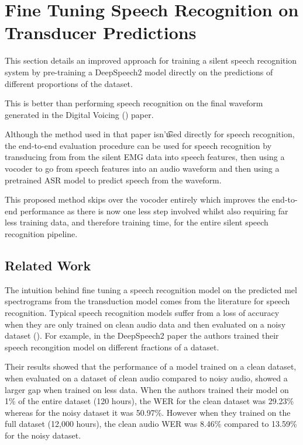 \section{Fine Tuning Speech Recognition on Transducer Predictions}

This section details an improved approach for training a silent speech
recognition system by pre-training a DeepSpeech2 model directly on the
predictions of different proportions of the dataset.

This is better than performing
speech recognition on the final waveform generated in the Digital Voicing
(\cite{gaddy2020digital}) paper.

Although the method used in that paper isn'\t
used directly for speech recognition, the end-to-end evaluation procedure
can be used for speech recognition by transducing from from the silent EMG
data into speech features, then using a vocoder to go from speech features
into an audio waveform and then using a pretrained ASR model to predict speech
from the waveform.

This proposed method skips over the vocoder entirely which improves the
end-to-end performance as there is now one less step involved whilst
also requiring far less training data, and therefore training time,
for the entire silent speech recognition pipeline.

\subsection{Related Work}

The intuition behind fine tuning a speech recognition model on the
predicted mel spectrograms from the transduction model comes
from the literature for speech recognition. Typical speech recognition models
suffer from a loss of accuracy when they are only trained on clean audio data
and then evaluated on a noisy dataset (\cite{DS2_original}). For example,
in the DeepSpeech2 paper the authors trained their speech recongition
model on different fractions of a dataset.

Their results showed that the
performance of a model trained on a clean dataset, when evaluated on a dataset
of clean audio compared to noisy audio, showed a larger gap when trained on less
data. When the authors trained their model on 1\% of the entire dataset (120 hours),
the WER for the clean dataset was 29.23\% whereas for the noisy dataset it was 50.97\%.
However when they trained on the full dataset (12,000 hours), the clean audio
WER was 8.46\% compared to 13.59\% for the noisy dataset.

